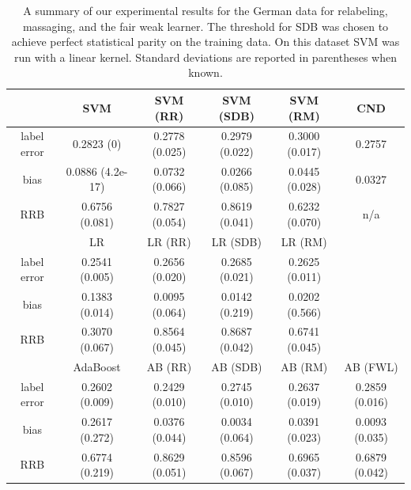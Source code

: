 \documentclass[twoside,leqno,twocolumn]{article}
\begin{document}
\begin{table}[h]
\centering
\begin{tabular}{| c | ccccc |}
\hline
               & SVM & SVM (RR) & SVM (SDB) & SVM (RM) & CND \cite{KamiranC09} \\
\hline
label error    & 0.2823 (0) & 0.2778 (0.025) & 0.2979 (0.022) & 0.3000 (0.017) & 0.2757  \\
bias           & 0.0886 (4.2e-17) & 0.0732 (0.066) & 0.0266 (0.085) & 0.0445 (0.028) & 0.0327   \\
RRB            & 0.6756 (0.081) & 0.7827 (0.054) & 0.8619 (0.041) & 0.6232 (0.070) & n/a  \\
\hline
               & LR & LR (RR) & LR (SDB) & LR (RM) &  \\
\hline
label error    & 0.2541 (0.005) & 0.2656 (0.020) & 0.2685 (0.021) & 0.2625 (0.011) &\\
bias           & 0.1383 (0.014) & 0.0095 (0.064) & 0.0142 (0.219) & 0.0202 (0.566) &\\
RRB            & 0.3070 (0.067) & 0.8564 (0.045) & 0.8687 (0.042) & 0.6741 (0.045) & \\
\hline
               & AdaBoost & AB (RR)  & AB (SDB)  & AB (RM)   & AB (FWL)  \\
\hline
label error    & 0.2602 (0.009) & 0.2429 (0.010) & 0.2745 (0.010) & 0.2637 (0.019) & 0.2859 (0.016)\\
bias           & 0.2617 (0.272) & 0.0376 (0.044) & 0.0034 (0.064) & 0.0391 (0.023) & 0.0093 (0.035)\\
RRB            & 0.6774 (0.219) & 0.8629 (0.051) & 0.8596 (0.067) & 0.6965 (0.037) & 0.6879 (0.042)\\
\hline
\hline
\end{tabular}
\caption{A summary of our experimental results for the German data for
relabeling, massaging, and the fair weak learner. The threshold for SDB was
chosen to achieve perfect statistical parity on the training data. On this
dataset SVM was run with a linear kernel. Standard deviations are reported in
parentheses when known. }
\label{table:german_results}
\end{table}
\end{document}

